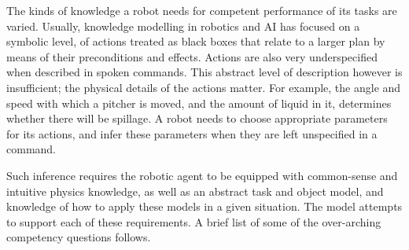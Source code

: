 
The kinds of knowledge a robot needs for competent performance of its tasks are varied. Usually, knowledge modelling in robotics and AI has focused on a symbolic level, of actions treated as black boxes that relate to a larger plan by means of their preconditions and effects. Actions are also very underspecified when described in spoken commands. This abstract level of description however is insufficient; the physical details of the actions matter. For example, the angle and speed with which a pitcher is moved, and the amount of liquid in it, determines whether there will be spillage. A robot needs to choose appropriate parameters for its actions, and infer these parameters when they are left unspecified in a command.

Such inference requires the robotic agent to be equipped with common-sense and intuitive physics knowledge, as well as an abstract task and object model, and knowledge of how to apply these models in a given situation.
The \neem model attempts to support each of these requirements.
A brief list of some of the over-arching competency questions follows.

